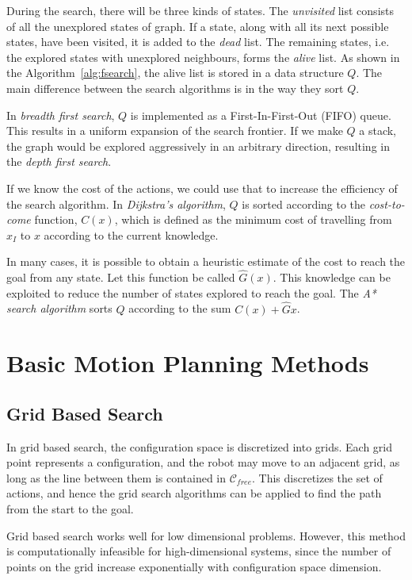 During the search, there will be three kinds of states. The \textit{unvisited} list consists of all the unexplored states of graph. If a state, along with all its next possible states, have been visited, it is added to the \textit{dead} list. The remaining states, i.e. the explored states with unexplored neighbours, forms the \textit{alive} list. As shown in the Algorithm~\ref{alg:fsearch}, the alive list is stored in a data structure $Q$. The main difference between the search algorithms is in the way they sort $Q$. 

In \textit{breadth first search}, $Q$ is implemented as a First-In-First-Out (FIFO) queue. This results in a uniform expansion of the search frontier. If we make $Q$ a stack, the graph would be explored aggressively in an arbitrary direction, resulting in the \textit{depth first search}. 

If we know the cost of the actions, we could use that to increase the efficiency of the search algorithm. In \textit{Dijkstra's algorithm}, $Q$ is sorted according to the \textit{cost-to-come} function, $C(x)$, which is defined as the minimum cost  of travelling from $x_I$ to $x$ according to the current knowledge. 

In many cases, it is possible to obtain a heuristic estimate of the cost to reach the goal from any state. Let this function be called $\hat{G}(x)$. This knowledge can be exploited to reduce the number of states explored to reach the goal. The \textit{A* search algorithm} sorts $Q$ according to the sum $C(x) + \hat{G}{x}$.


\section{Basic Motion Planning Methods}
\label{sec:basic_motion_planning}
\subsection{Grid Based Search}
\label{sec:grid_search}
In grid based search, the configuration space is discretized into grids. Each grid point represents a configuration, and the robot may move to an adjacent grid, as long as the line between them is contained in $\mathcal{C}_{free}$. This discretizes the set of actions, and hence the grid search algorithms can be applied to find the path from the start to the goal. 

Grid based search works well for low dimensional problems. However, this method is computationally infeasible for high-dimensional systems, since the number of points on the grid increase exponentially with configuration space dimension. 
